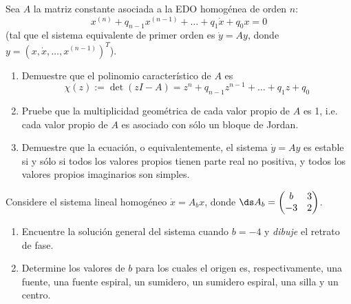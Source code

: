 \documentclass{homework}
\begin{document}
\begin{prob}
    Sea \(A\) la matriz constante asociada a la EDO homogénea de orden \(n\):
    \[x^{(n)}+q_{n-1}x^{(n-1)}+\dots+q_1\dot{x}+q_0x=0\]
    (tal que el sistema equivalente de primer orden es \(\dot{y}=Ay\), donde \(y=(x,\dot{x},\dots,x^{(n-1)})^T\)).
    \begin{enumerate}[label=(\alph*)]
        \item Demuestre que el polinomio característico de \(A\) es
        \[\chi(z):=\det(zI-A)=z^n+q_{n-1}z^{n-1}+\dots+q_1z+q_0\]
        \item Pruebe que la multiplicidad geométrica de cada valor propio de \(A\) es 1, i.e. cada valor propio de \(A\) es asociado con sólo un bloque de Jordan.
        \item Demuestre que la ecuación, o equivalentemente, el sistema \(\dot{y}=Ay\) es estable si y sólo si todos los valores propios tienen parte real no positiva, y todos los valores propios imaginarios son simples.
    \end{enumerate}
\end{prob}

\begin{sol}
    
\end{sol}

\begin{prob}
    Considere el sistema lineal homogéneo \(\dot{x}=A_bx\), donde \(\ds A_b=\begin{pmatrix}
        b & 3\\-3 & 2
    \end{pmatrix}\).
    \begin{enumerate}[label=(\alph*)]
        \item Encuentre la solución general del sistema cuando \(b=-4\) y \textit{dibuje} el retrato de fase.
        \item Determine los valores de \(b\) para los cuales el origen es, respectivamente, una fuente, una fuente espiral, un sumidero, un sumidero espiral, una silla y un centro.
    \end{enumerate}
\end{prob}
\end{document}

